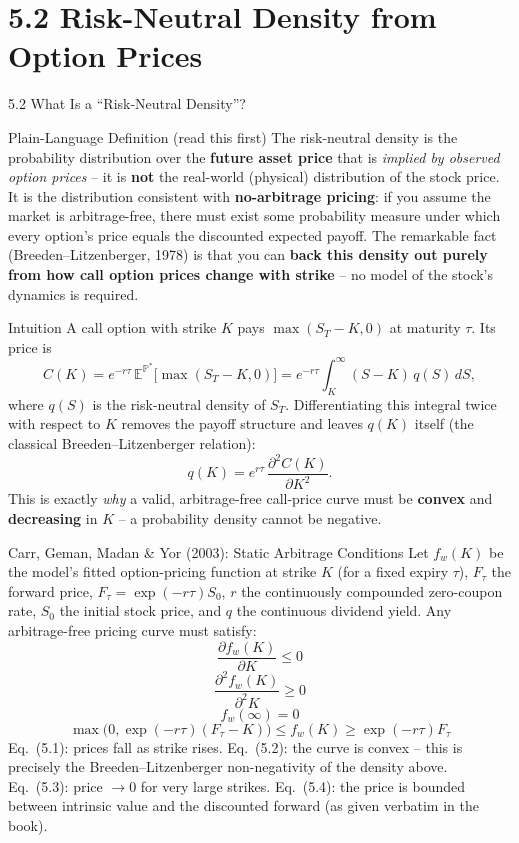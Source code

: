 \documentclass[aspectratio=169,10pt]{beamer}
\newcommand{\Prob}{\mathbb{P}}
\newcommand{\Exp}{\mathbb{E}}
\begin{document}
\section{5.2 Risk-Neutral Density from Option Prices}
\begin{frame}[allowframebreaks]{5.2 What Is a ``Risk-Neutral Density''?}

\begin{block}{Plain-Language Definition (read this first)}
The risk-neutral density is the probability distribution over the
\textbf{future asset price} that is \emph{implied by observed option prices}
-- it is \textbf{not} the real-world (physical) distribution of the stock
price. It is the distribution consistent with \textbf{no-arbitrage pricing}:
if you assume the market is arbitrage-free, there must exist some
probability measure under which every option's price equals the discounted
expected payoff. The remarkable fact (Breeden--Litzenberger, 1978) is that
you can \textbf{back this density out purely from how call option prices
change with strike} -- no model of the stock's dynamics is required.
\end{block}

\begin{block}{Intuition}
A call option with strike $K$ pays $\max(S_T-K,0)$ at maturity $\tau$.
Its price is
\[
C(K) = e^{-r\tau}\,\Exp^{\Prob^*}\!\big[\max(S_T-K,0)\big]
     = e^{-r\tau}\int_K^\infty (S-K)\,q(S)\,dS ,
\]
where $q(S)$ is the risk-neutral density of $S_T$. Differentiating this
integral twice with respect to $K$ removes the payoff structure and leaves
$q(K)$ itself (the classical Breeden--Litzenberger relation):
\[
q(K) = e^{r\tau}\,\frac{\partial^2 C(K)}{\partial K^2}.
\]
This is exactly \emph{why} a valid, arbitrage-free call-price curve must be
\textbf{convex} and \textbf{decreasing} in $K$ -- a probability density
cannot be negative.
\end{block}

\framebreak

\begin{block}{Carr, Geman, Madan \& Yor (2003): Static Arbitrage Conditions}
Let $f_w(K)$ be the model's fitted option-pricing function at strike $K$
(for a fixed expiry $\tau$), $F_\tau$ the forward price, $F_\tau =
\exp(-r\tau)S_0$, $r$ the continuously compounded zero-coupon rate, $S_0$
the initial stock price, and $q$ the continuous dividend yield. Any
arbitrage-free pricing curve must satisfy:
\[
\frac{\partial f_w(K)}{\partial K} \le 0 \tag{5.1}
\]
\[
\frac{\partial^2 f_w(K)}{\partial^2 K} \ge 0 \tag{5.2}
\]
\[
f_w(\infty) = 0 \tag{5.3}
\]
\[
\max\big(0,\exp(-r\tau)(F_\tau-K)\big) \le f_w(K) \ge \exp(-r\tau)F_\tau \tag{5.4}
\]
Eq.~(5.1): prices fall as strike rises. Eq.~(5.2): the curve is convex --
this is precisely the Breeden--Litzenberger non-negativity of the density
above. Eq.~(5.3): price $\to 0$ for very large strikes. Eq.~(5.4): the price
is bounded between intrinsic value and the discounted forward (as given
verbatim in the book).
\end{block}


\end{frame}
\end{document}
